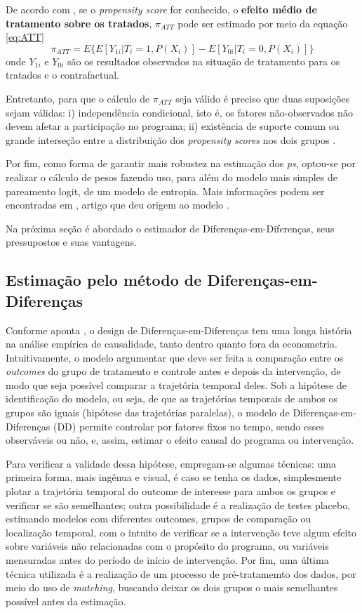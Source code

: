 De acordo com , se o \textit{propensity score} for conhecido, o \textbf{efeito médio de tratamento sobre os tratados}, $\pi_{ATT}$ pode ser estimado por meio da equação \ref{eq:ATT}
\begin{equation} \label{eq:ATT} \tag{3.1.4}
\pi_{ATT} = E\{E[Y_{1i}|T_i = 1, P(X_i)] - E[
Y_{0i}|T_i = 0, P(X_i)]\}
\end{equation} 
onde $Y_{1i}$ e $Y_{0i}$ são os resultados observados na situação de tratamento para os tratados e o contrafactual.

Entretanto, para que o cálculo de $\pi_{ATT}$ seja válido é preciso que duas suposições sejam válidas: i) independência condicional, isto é, os fatores não-observados não devem afetar a participação no programa; ii) existência de suporte comum ou grande interseção entre a distribuição dos \textit{propensity scores} nos dois grupos \cite[p.~55]{Khandker2010}.

Por fim, como forma de garantir mais robustez na estimação dos \textit{ps}, optou-se por realizar o cálculo de pesos fazendo uso, para além do modelo mais simples de pareamento logit, de um modelo de entropia. Mais informações podem ser encontradas em , artigo que deu origem ao modelo .

Na próxima seção é abordado o estimador de Diferenças-em-Diferenças, seus pressupostos e suas vantagens.

\subsection{Estimação pelo método de Diferenças-em-Diferenças}

Conforme aponta , o design de Diferenças-em-Diferenças tem uma longa história na análise empírica de causalidade, tanto dentro quanto fora da econometria. Intuitivamente, o modelo argumentar que deve ser feita a comparação entre os \textit{outcomes} do grupo de tratamento e controle antes e depois da intervenção, de modo que seja possível comparar a trajetória temporal deles. Sob a hipótese de identificação do modelo, ou seja, de que as trajetórias temporais de ambos os grupos são iguais (hipótese das trajetórias paralelas), o modelo de Diferenças-em-Diferenças (DD) permite controlar por fatores fixos no tempo, sendo esses observáveis ou não, e, assim, estimar o efeito causal do programa ou intervenção.

Para verificar a validade dessa hipótese, empregam-se algumas técnicas: uma primeira forma, mais ingênua e visual, é caso se tenha os dados, simplesmente plotar a trajetória temporal do outcome de interesse para ambos os grupos e verificar se são semelhantes; outra possibilidade é a realização de testes placebo, estimando modelos com diferentes outcomes, grupos de comparação ou localização temporal, com o intuito de verificar se a intervenção teve algum efeito sobre variáveis não relacionadas com o propósito do programa, ou variáveis mensuradas antes do período de início de intervenção. Por fim, uma última técnica utilizada é a realização de um processo de pré-tratamemto dos dados, por meio do uso de \textit{matching}, buscando deixar os dois grupos o mais semelhantes possível antes da estimação.

